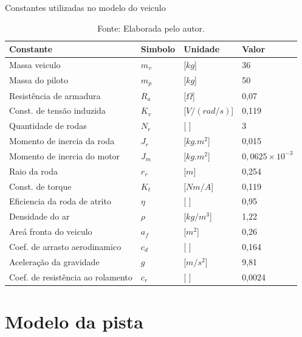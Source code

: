 \begin{table}[h]
	\centering
	\caption{Constantes utilizadas no modelo do veiculo}
	\begin{tabular}{llll}
		\toprule
		\textbf{Constante} & \textbf{Simbolo} & \textbf{Unidade} & \textbf{Valor}\\
		\hline
		Massa veiculo                       & $m_v$  & [$kg$]              & 36      \\
        Massa do piloto                     & $m_p$  & [$kg$]              & 50      \\
        Resistência de armadura             & $R_a$  & [$\Omega$]        & 0,07    \\  
        Const. de tensão induzida           & $K_v$  & [$V/(rad/s)$]       & 0,119   \\
        Quantidade de rodas                 & $N_r$  & [ ]                & 3       \\
        Momento de inercia da roda          & $J_r$  & [$kg.m^2$]        & 0,015   \\
        Momento de inercia do motor         & $J_m$  & [$kg.m^2$]        & $0,0625 \times 10^{-3}$\\
        Raio da roda                        & $r_r$  & [$m$]               & 0,254   \\
        Const. de torque                    & $K_t$  & [$Nm/A$]            & 0,119   \\
        Eficiencia da roda de atrito        & $\eta$ & [ ]                & 0,95    \\
        Densidade do ar                     & $\rho$ & [$kg/m^3$]        & 1,22    \\
        Areá fronta do veiculo              & $a_f$  & [$m^2$]           & 0,26    \\
        Coef. de arrasto aerodinamico       & $c_d$  & [ ]                & 0,164   \\
        Aceleração da gravidade             & $g$    & [$m/s^2$]         & 9,81    \\
        Coef. de resistência ao rolamento   & $c_r$  & [ ]                & 0,0024  \\
		\bottomrule
	\end{tabular}
	\caption*{\footnotesize Fonte: Elaborada pelo autor.}
	\label{tab:constantes}
\end{table}


\section{Modelo da pista}

